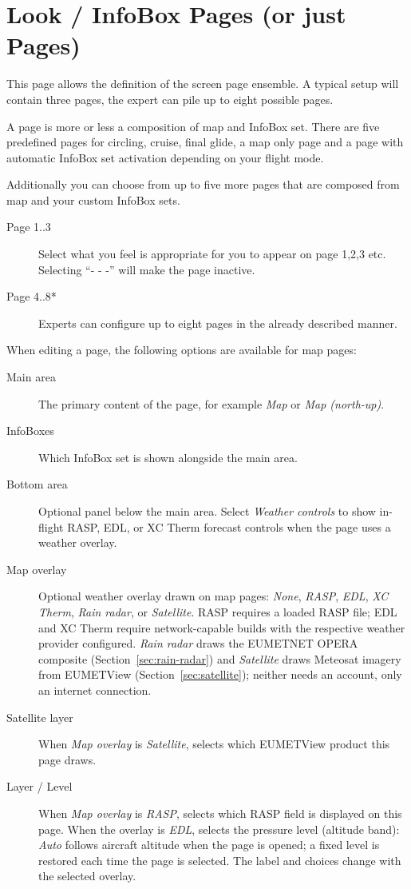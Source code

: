 \section{Look / InfoBox Pages (or just Pages)}\label{conf:screenpages}

This page allows the definition of the screen page ensemble. A typical setup 
will contain three pages, the expert can pile up to eight possible pages.

A page is more or less a composition of map and InfoBox set. There are five 
predefined pages for circling, cruise, final glide, a map only page and a 
page with automatic InfoBox set activation depending on your flight mode.

Additionally you can choose from up to five more pages that are composed from map 
and your custom InfoBox sets.  

\begin{description}
\item[Page 1..3]  Select what you feel is appropriate for you to appear on page 1,2,3 etc. 
  Selecting ``- - -'' will make the page inactive.
\item[Page 4..8*]  Experts can configure up to eight pages in the already 
  described manner.
\end{description}

When editing a page, the following options are available for map pages:
\begin{description}
\item[Main area]  The primary content of the page, for example \emph{Map}
  or \emph{Map (north-up)}.
\item[InfoBoxes]  Which InfoBox set is shown alongside the main area.
\item[Bottom area]  Optional panel below the main area.  Select
  \emph{Weather controls} to show in-flight RASP, EDL, or XC Therm forecast
  controls when the page uses a weather overlay.
\item[Map overlay]  Optional weather overlay drawn on map pages: \emph{None},
  \emph{RASP}, \emph{EDL}, \emph{XC Therm}, \emph{Rain radar}, or
  \emph{Satellite}.  RASP requires a loaded RASP file; EDL and XC Therm
  require network-capable builds with the respective weather provider
  configured.  \emph{Rain radar} draws the EUMETNET OPERA composite
  (Section~\ref{sec:rain-radar}) and \emph{Satellite} draws Meteosat
  imagery from EUMETView (Section~\ref{sec:satellite}); neither needs an
  account, only an internet connection.
\item[Satellite layer]  When \emph{Map overlay} is \emph{Satellite},
  selects which EUMETView product this page draws.
\item[Layer / Level]  When \emph{Map overlay} is \emph{RASP}, selects
  which RASP field is displayed on this page.  When the overlay is
  \emph{EDL}, selects the pressure level (altitude band): \emph{Auto}
  follows aircraft altitude when the page is opened; a fixed level is
  restored each time the page is selected.  The label and choices
  change with the selected overlay.
\end{description}


